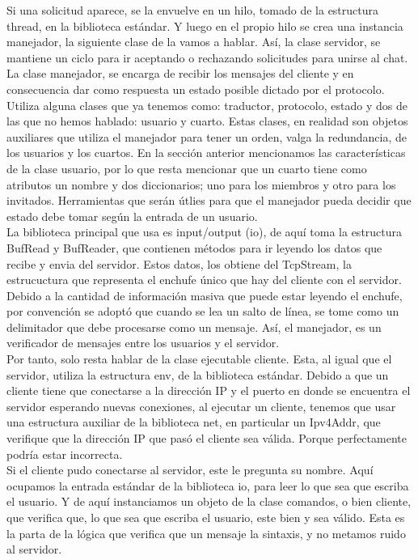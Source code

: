 \documentclass{article}
\begin{document}
Si una solicitud aparece, se la envuelve en un hilo, tomado de la estructura thread, en la biblioteca estándar. Y luego en el propio hilo se crea una instancia manejador, la siguiente clase de la vamos a hablar. Así, la clase servidor, se mantiene un ciclo para ir aceptando o rechazando solicitudes para unirse al chat.\\

La clase manejador, se encarga de recibir los mensajes del cliente y en consecuencia dar como respuesta un estado posible dictado por el protocolo. Utiliza alguna clases que ya tenemos como: traductor, protocolo, estado y dos de las que no hemos hablado: usuario y cuarto. Estas clases, en realidad son objetos auxiliares que utiliza el manejador para tener un orden, valga la redundancia, de los usuarios y los cuartos. En la sección anterior mencionamos las características de la clase usuario, por lo que resta mencionar que un cuarto tiene como atributos un nombre y dos diccionarios; uno para los miembros y otro para los invitados. Herramientas que serán útlies para que el manejador pueda decidir que estado debe tomar según la entrada de un usuario.\\

La biblioteca principal que usa es input/output (io), de aquí toma la estructura BufRead y BufReader, que contienen métodos para ir leyendo los datos que recibe y envia del servidor. Estos datos, los obtiene del TcpStream, la estrucuctura que representa el enchufe único que hay del cliente con el servidor. Debido a la cantidad de información masiva que puede estar leyendo el enchufe, por convención se adoptó que cuando se lea un salto de línea, se tome como un delimitador que debe procesarse como un mensaje. Así, el manejador, es un verificador de mensajes entre los usuarios y el servidor.\\

Por tanto, solo resta hablar de la clase ejecutable cliente. Esta, al igual que el servidor, utiliza la estructura env, de la biblioteca estándar. Debido a que un cliente tiene que conectarse a la dirección IP y el puerto en donde se encuentra el servidor esperando nuevas conexiones, al ejecutar un cliente, tenemos que usar una estructura auxiliar de la biblioteca net, en particular un Ipv4Addr, que verifique que la dirección IP que pasó el cliente sea válida. Porque perfectamente podría estar incorrecta.\\

Si el cliente pudo conectarse al servidor, este le pregunta su nombre. Aquí ocupamos la entrada estándar de la biblioteca io, para leer lo que sea que escriba el usuario. Y de aquí instanciamos un objeto de la clase comandos, o bien cliente, que verifica que, lo que sea que escriba el usuario, este bien y sea válido. Esta es la parta de la lógica que verifica que un mensaje la sintaxis, y no metamos ruido al servidor.\\
\end{document}
